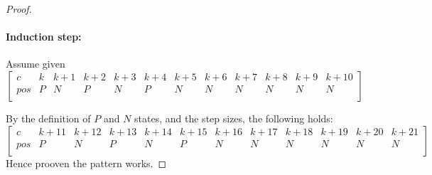 \documentclass[addpoints,answers]{exam}
\begin{document}
\begin{questions}
\begin{solutionorbox}[\stretch{1}]
\begin{proof}
							\paragraph{Induction step:}Assume given 
							\[
							\begin{bmatrix}
								c   & k & k+1 & k+2 & k+3 & k+4 & k+5 & k+6 & k+7 & k+8 & k+9 & k+10 \\
								pos & P & N & P & N & P & N & N & N & N & N & N  \\
							\end{bmatrix}
							\]

							By the definition of $P$ and $N$ states, and the step sizes, the following holds:
							\[
							\begin{bmatrix}
								c   & k+11 & k+12 & k+13 & k+14 & k+15 & k+16 & k+17 & k+18 &
								k+19 & k+20 & k+21 \\
								pos & P & N & P & N & P & N & N & N & N & N & N  \\
							\end{bmatrix}
							\]
							Hence prooven the pattern works.
						\end{proof}
            \end{solutionorbox}
            \newpage
 
\end{questions}
\end{document}
